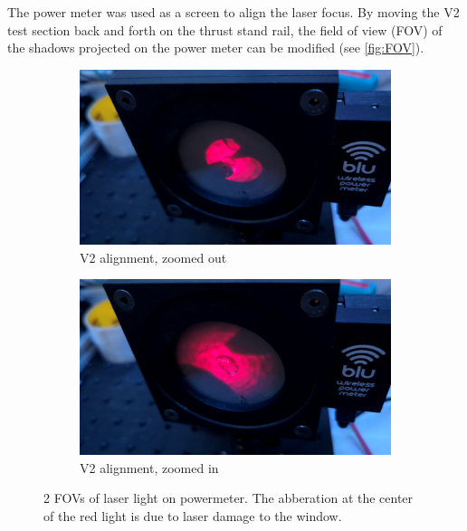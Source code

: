            The power meter was used as a screen to align the laser focus. By moving the V2 test section back and forth on the thrust stand rail, the field of view (FOV) of the shadows projected on the power meter can be modified (see \autoref{fig:FOV}). 
            
            \begin{figure}[!ht]
                \centering
                \begin{subfigure}[t]{0.45\textwidth}
                    \centering
                    \includegraphics[width=\textwidth]{assets/4 experiments/V2 alignment 1.png}
                    \caption{V2 alignment, zoomed out}
                \end{subfigure}
                \hfill
                \begin{subfigure}[t]{0.45\textwidth}
                    \centering
                    \includegraphics[width=\textwidth]{assets/4 experiments/V2 alignment 2.png}
                    \caption{V2 alignment, zoomed in}
                \end{subfigure}
                \caption{2 FOVs of laser light on powermeter. The abberation at the center of the red light is due to laser damage to the window.}
                \label{fig:FOV}
            \end{figure}



